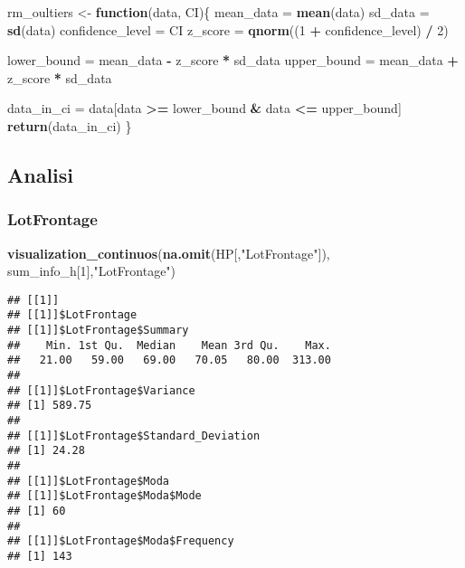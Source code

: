 \documentclass[
]{article}
\newenvironment{Shaded}{\begin{snugshade}}{\end{snugshade}}
\newcommand{\ControlFlowTok}[1]{\textcolor[rgb]{0.13,0.29,0.53}{\textbf{#1}}}
\newcommand{\DecValTok}[1]{\textcolor[rgb]{0.00,0.00,0.81}{#1}}
\newcommand{\FunctionTok}[1]{\textcolor[rgb]{0.13,0.29,0.53}{\textbf{#1}}}
\newcommand{\NormalTok}[1]{#1}
\newcommand{\OtherTok}[1]{\textcolor[rgb]{0.56,0.35,0.01}{#1}}
\newcommand{\SpecialCharTok}[1]{\textcolor[rgb]{0.81,0.36,0.00}{\textbf{#1}}}
\newcommand{\StringTok}[1]{\textcolor[rgb]{0.31,0.60,0.02}{#1}}
\begin{document}
\begin{Shaded}
\begin{Highlighting}[]
\NormalTok{rm\_oultiers }\OtherTok{\textless{}{-}} \ControlFlowTok{function}\NormalTok{(data, CI)\{}
\NormalTok{  mean\_data }\OtherTok{=} \FunctionTok{mean}\NormalTok{(data)}
\NormalTok{  sd\_data }\OtherTok{=} \FunctionTok{sd}\NormalTok{(data)}
\NormalTok{  confidence\_level }\OtherTok{=}\NormalTok{ CI}
\NormalTok{  z\_score }\OtherTok{=} \FunctionTok{qnorm}\NormalTok{((}\DecValTok{1} \SpecialCharTok{+}\NormalTok{ confidence\_level) }\SpecialCharTok{/} \DecValTok{2}\NormalTok{)}
  
\NormalTok{  lower\_bound }\OtherTok{=}\NormalTok{ mean\_data }\SpecialCharTok{{-}}\NormalTok{ z\_score }\SpecialCharTok{*}\NormalTok{ sd\_data}
\NormalTok{  upper\_bound }\OtherTok{=}\NormalTok{ mean\_data }\SpecialCharTok{+}\NormalTok{ z\_score }\SpecialCharTok{*}\NormalTok{ sd\_data}
  
\NormalTok{  data\_in\_ci }\OtherTok{=}\NormalTok{ data[data }\SpecialCharTok{\textgreater{}=}\NormalTok{ lower\_bound }\SpecialCharTok{\&}\NormalTok{ data }\SpecialCharTok{\textless{}=}\NormalTok{ upper\_bound]}
  \FunctionTok{return}\NormalTok{(data\_in\_ci)}
\NormalTok{\}}
\end{Highlighting}
\end{Shaded}

\subsection{Analisi}\label{analisi}

\subsubsection{LotFrontage}\label{lotfrontage}

\begin{Shaded}
\begin{Highlighting}[]
\FunctionTok{visualization\_continuos}\NormalTok{(}\FunctionTok{na.omit}\NormalTok{(HP[,}\StringTok{"LotFrontage"}\NormalTok{]), sum\_info\_h[}\DecValTok{1}\NormalTok{],}\StringTok{"LotFrontage"}\NormalTok{)}
\end{Highlighting}
\end{Shaded}

\begin{verbatim}
## [[1]]
## [[1]]$LotFrontage
## [[1]]$LotFrontage$Summary
##    Min. 1st Qu.  Median    Mean 3rd Qu.    Max. 
##   21.00   59.00   69.00   70.05   80.00  313.00 
## 
## [[1]]$LotFrontage$Variance
## [1] 589.75
## 
## [[1]]$LotFrontage$Standard_Deviation
## [1] 24.28
## 
## [[1]]$LotFrontage$Moda
## [[1]]$LotFrontage$Moda$Mode
## [1] 60
## 
## [[1]]$LotFrontage$Moda$Frequency
## [1] 143
\end{verbatim}
\end{document}
